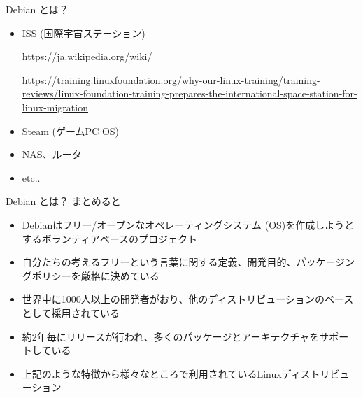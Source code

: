 \documentclass[cjk,dvipdfmx,10pt,compress,%
hyperref={bookmarks=true,bookmarksnumbered=true,bookmarksopen=false,%
colorlinks=false,%
pdftitle={第 132 回 関西 Debian 勉強会},%
pdfauthor={かわだ},%
pdfsubject={資料},%
}]{beamer}
\begin{document}
\begin{frame}{Debian とは？}
\begin{itemize}
\item ISS (国際宇宙ステーション)
\begin{center}
 https://ja.wikipedia.org/wiki/%
\end{center}
{\tiny \url{https://training.linuxfoundation.org/why-our-linux-training/training-reviews/linux-foundation-training-prepares-the-international-space-station-for-linux-migration}}

\item Steam (ゲームPC OS)
\item NAS、ルータ
\item etc..
\end{itemize}
\end{frame}

\begin{frame}{Debian とは？}
まとめると
\begin{itemize}
  \item Debianはフリー/オープンなオペレーティングシステム (OS)を作成しようとするボランティアベースのプロジェクト
  \item 自分たちの考えるフリーという言葉に関する定義、開発目的、パッケージングポリシーを厳格に決めている
  \item 世界中に1000人以上の開発者がおり、他のディストリビューションのベースとして採用されている
  \item 約2年毎にリリースが行われ、多くのパッケージとアーキテクチャをサポートしている
  \item 上記のような特徴から様々なところで利用されているLinuxディストリビューション
\end{itemize}
\end{frame}

\end{document}
